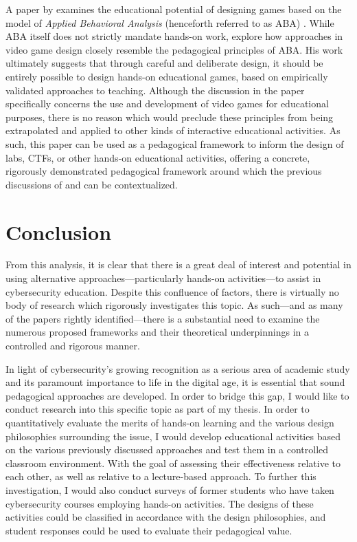     A paper by \citeauthor{C-Linehan} examines the educational potential of designing games based on the model of \emph{Applied Behavioral Analysis} (henceforth referred to as ABA) \cite{C-Linehan}. While ABA itself does not strictly mandate hands-on work, \citeauthor{C-Linehan} explore how approaches in video game design closely resemble the pedagogical principles of ABA. His work ultimately suggests that through careful and deliberate design, it should be entirely possible to design hands-on educational games, based on empirically validated approaches to teaching. Although the discussion in the paper specifically concerns the use and development of video games for educational purposes, there is no reason which would preclude these principles from being extrapolated and applied to other kinds of interactive educational activities. As such, this paper can be used as a pedagogical framework to inform the design of labs, CTFs, or other hands-on educational activities, offering a concrete, rigorously demonstrated pedagogical framework around which the previous discussions of \citeauthor{J-Sweller} and \citeauthor{R-Weiss} can be contextualized. 


\section{Conclusion}

    From this analysis, it is clear that there is a great deal of interest and potential in using alternative approaches---particularly hands-on activities---to assist in cybersecurity education. Despite this confluence of factors, there is virtually no body of research which rigorously investigates this topic. As such---and as many of the papers rightly identified---there is a substantial need to examine the numerous proposed frameworks and their theoretical underpinnings in a controlled and rigorous manner. 

    In light of cybersecurity's growing recognition as a serious area of academic study and its paramount importance to life in the digital age, it is essential that sound pedagogical approaches are developed. In order to bridge this gap, I would like to conduct research into this specific topic as part of my thesis. In order to quantitatively evaluate the merits of hands-on learning and the various design philosophies surrounding the issue, I would develop educational activities based on the various previously discussed approaches and test them in a controlled classroom environment. With the goal of assessing their effectiveness relative to each other, as well as relative to a lecture-based approach. To further this investigation, I would also conduct surveys of former students who have taken cybersecurity courses employing hands-on activities. The designs of these activities could be classified in accordance with the design philosophies, and student responses could be used to evaluate their pedagogical value. 
